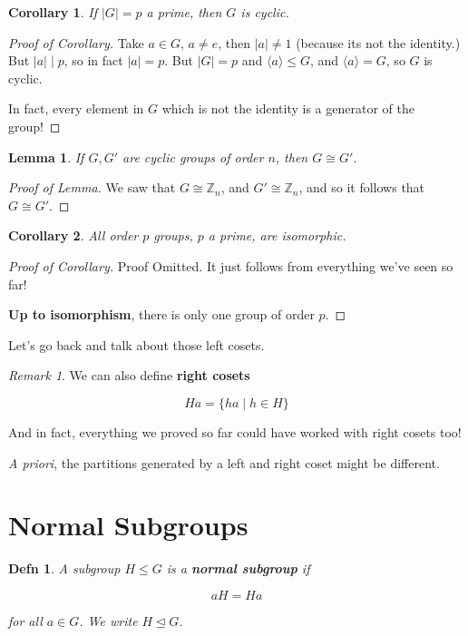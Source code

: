 \documentclass[12pt]{article}
\def\Z{{\mathbb Z}}
\newcommand{\lr}[1]{\langle #1 \rangle}
\newtheorem{definition}{Defn}
\newtheorem{corollary}{Corollary}
\newtheorem{lemma}[theorem]{Lemma} %
\theoremstyle{remark}
\theoremstyle{remark}
\theoremstyle{remark}
\theoremstyle{remark}
\newtheorem*{remark}{Remark}
\theoremstyle{remark}
\begin{document}
\begin{corollary}
  If $|G| = p$ a prime, then $G$ is cyclic.
\end{corollary}
\begin{proof}[Proof of Corollary]
  Take $a \in G$, $a \ne e$, then $|a| \ne 1$ (because its not the identity.)
  But $|a| \mid p$, so in fact $|a| = p$. But $|G| = p$ and $\lr {a} \le G$, and
  $\lr {a} = G$, so $G$ is cyclic.

  In fact, every element in $G$ which is not the identity is a generator of the
  group!
\end{proof}

\begin{lemma}
  If $G, G'$ are cyclic groups of order $n$, then $G \cong G'$.
\end{lemma}
\begin{proof}[Proof of Lemma]
  We saw that $G \cong \Z_n$, and $G' \cong \Z_n$, and so it follows that $G \cong G'$.
\end{proof}

\begin{corollary}
  All order $p$ groups, $p$ a prime, are isomorphic.
\end{corollary}
\begin{proof}[Proof of Corollary]
  Proof Omitted. It just follows from everything we've seen so far!

  {\bf Up to isomorphism}, there is only one group of order $p$.
\end{proof}

Let's go back and talk about those left cosets.

\begin{remark}
  We can also define {\bf right cosets}

  \[
    Ha = \{ ha \mid h \in H \}
  \]

  And in fact, everything we proved so far could have worked with right cosets
  too!
\end{remark}

{\it A priori}, the partitions generated by a left and right coset might be
different.

\section{Normal Subgroups}

\begin{definition}
  A subgroup $H \le G$ is a {\bf normal subgroup} if

  \[
    aH = Ha
  \]

  for all $a \in G$. We write $H \trianglelefteq G$.
\end{definition}
\end{document}
